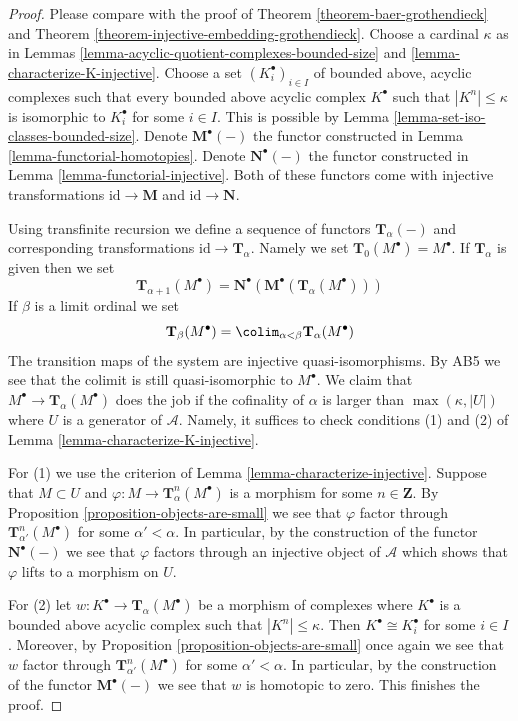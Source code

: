\begin{proof}
Please compare with the proof of
Theorem \ref{theorem-baer-grothendieck}
and
Theorem \ref{theorem-injective-embedding-grothendieck}.
Choose a cardinal $\kappa$ as in
Lemmas \ref{lemma-acyclic-quotient-complexes-bounded-size} and
\ref{lemma-characterize-K-injective}.
Choose a set $(K_i^\bullet)_{i \in I}$
of bounded above, acyclic complexes
such that every bounded above acyclic complex $K^\bullet$
such that $|K^n| \leq \kappa$ is isomorphic to $K_i^\bullet$ for some
$i \in I$. This is possible by
Lemma \ref{lemma-set-iso-classes-bounded-size}.
Denote $\mathbf{M}^\bullet(-)$ the functor constructed in
Lemma \ref{lemma-functorial-homotopies}.
Denote $\mathbf{N}^\bullet(-)$ the functor constructed in
Lemma \ref{lemma-functorial-injective}.
Both of these functors come with injective transformations
$\text{id} \to \mathbf{M}$ and $\text{id} \to \mathbf{N}$.

\medskip\noindent
Using transfinite recursion we define a sequence of functors
$\mathbf{T}_\alpha(-)$ and corresponding transformations
$\text{id} \to \mathbf{T}_\alpha$. Namely we set
$\mathbf{T}_0(M^\bullet) = M^\bullet$. If $\mathbf{T}_\alpha$ is
given then we set
$$
\mathbf{T}_{\alpha + 1}(M^\bullet) =
\mathbf{N}^\bullet(\mathbf{M}^\bullet(\mathbf{T}_\alpha(M^\bullet)))
$$
If $\beta$ is a limit ordinal we set
$$
\mathbf{T}_\beta(M^\bullet) =
\colim_{\alpha < \beta} \mathbf{T}_\alpha(M^\bullet)
$$
The transition maps of the system are injective quasi-isomorphisms.
By AB5 we see that the colimit is still quasi-isomorphic to $M^\bullet$.
We claim that $M^\bullet \to \mathbf{T}_\alpha(M^\bullet)$
does the job if the cofinality of $\alpha$ is larger than
$\max(\kappa, |U|)$ where $U$ is a generator of $\mathcal{A}$.
Namely, it suffices to check conditions (1) and (2) of
Lemma \ref{lemma-characterize-K-injective}.

\medskip\noindent
For (1) we use the criterion of
Lemma \ref{lemma-characterize-injective}.
Suppose that $M \subset U$ and $\varphi : M \to \mathbf{T}^n_\alpha(M^\bullet)$
is a morphism for some $n \in \mathbf{Z}$. By
Proposition \ref{proposition-objects-are-small}
we see that $\varphi$ factor through
$\mathbf{T}^n_{\alpha'}(M^\bullet)$ for some $\alpha' < \alpha$.
In particular, by the construction of the functor
$\mathbf{N}^\bullet(-)$ we see that $\varphi$ factors through
an injective object of $\mathcal{A}$ which shows that $\varphi$
lifts to a morphism on $U$.

\medskip\noindent
For (2) let $w : K^\bullet  \to \mathbf{T}_\alpha(M^\bullet)$
be a morphism of complexes where $K^\bullet$ is a bounded above acyclic
complex such that $|K^n| \leq \kappa$. Then $K^\bullet \cong K_i^\bullet$
for some $i \in I$. Moreover, by
Proposition \ref{proposition-objects-are-small}
once again we see that $w$ factor through
$\mathbf{T}^n_{\alpha'}(M^\bullet)$ for some $\alpha' < \alpha$.
In particular, by the construction of the functor
$\mathbf{M}^\bullet(-)$ we see that $w$ is homotopic to zero.
This finishes the proof.
\end{proof}
